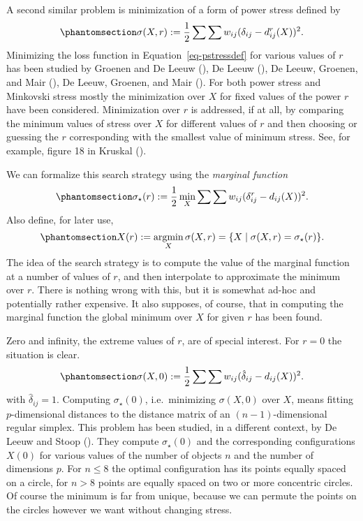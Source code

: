 \documentclass[
  12pt,
  letterpaper,
  DIV=11,
  numbers=noendperiod]{scrartcl}
\begin{document}
A second similar problem is minimization of a form of power stress
defined by \begin{equation}\phantomsection\label{eq-pstressdef}{
\sigma(X,r):=\frac12\sum\sum w_{ij}(\delta_{ij}-d_{ij}^r(X))^2.
}\end{equation} Minimizing the loss function in
Equation~\ref{eq-pstressdef} for various values of \(r\) has been
studied by Groenen and De Leeuw
(), De Leeuw
(), De Leeuw, Groenen, and Mair
(), De Leeuw, Groenen,
and Mair (). For both
power stress and Minkovski stress mostly the minimization over \(X\) for
fixed values of the power \(r\) have been considered. Minimization over
\(r\) is addressed, if at all, by comparing the minimum values of stress
over \(X\) for different values of \(r\) and then choosing or guessing
the \(r\) corresponding with the smallest value of minimum stress. See,
for example, figure 18 in Kruskal ().

We can formalize this search strategy using the \emph{marginal function}
\begin{equation}\phantomsection\label{eq-marginal}{
\sigma_\star(r):=\frac12\min_X\sum\sum w_{ij}(\delta_{ij}^r-d_{ij}(X))^2.
}\end{equation} Also define, for later use,
\begin{equation}\phantomsection\label{eq-argmin}{
X(r):=\mathop{\text{argmin}}_X\sigma(X, r)=\{X\mid\sigma(X,r) = \sigma_\star(r)\}.
}\end{equation} The idea of the search strategy is to compute the value
of the marginal function at a number of values of \(r\), and then
interpolate to approximate the minimum over \(r\). There is nothing
wrong with this, but it is somewhat ad-hoc and potentially rather
expensive. It also supposes, of course, that in computing the marginal
function the global minimum over \(X\) for given \(r\) has been found.

Zero and infinity, the extreme values of \(r\), are of special interest.
For \(r=0\) the situation is clear.
\begin{equation}\phantomsection\label{eq-rstressnull}{
\sigma(X, 0):=\frac12\sum\sum w_{ij}(\hat\delta_{ij}-d_{ij}(X))^2.
}\end{equation} with \(\hat\delta_{ij}=1\). Computing
\(\sigma_\star(0)\), i.e.~minimizing \(\sigma(X, 0)\) over \(X\), means
fitting \(p\)-dimensional distances to the distance matrix of an
\((n-1)\)-dimensional regular simplex. This problem has been studied, in
a different context, by De Leeuw and Stoop
(). They compute
\(\sigma_\star(0)\) and the corresponding configurations \(X(0)\) for
various values of the number of objects \(n\) and the number of
dimensions \(p\). For \(n\leq 8\) the optimal configuration has its
points equally spaced on a circle, for \(n>8\) points are equally spaced
on two or more concentric circles. Of course the minimum is far from
unique, because we can permute the points on the circles however we want
without changing stress.
\end{document}
